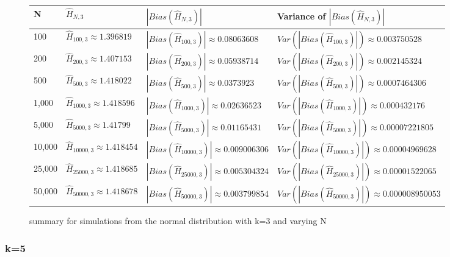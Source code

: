 \documentclass{article}
\begin{document}
\begin{figure} 
 \begin{adjustwidth}{-2cm}{}
\begin{tabular}{|l|l|l|l|}
\hline
N & $\hat{H}_{N, 3}$ & $|Bias(\hat{H}_{N, 3})|$ & Variance of $|Bias(\hat{H}_{N, 3})|$ \\
\hline
100 & $\hat{H}_{100, 3} \approx 1.396819$ & $|Bias(\hat{H}_{100, 3})| \approx 0.08063608$ & $Var(|Bias(\hat{H}_{100, 3})|) \approx 0.003750528$\\
200 & $\hat{H}_{200, 3} \approx 1.407153$ & $|Bias(\hat{H}_{200, 3})| \approx 0.05938714$ & $Var(|Bias(\hat{H}_{200, 3})|) \approx 0.002145324$\\
500 & $\hat{H}_{500, 3} \approx 1.418022$ & $|Bias(\hat{H}_{500, 3})| \approx 0.0373923$ & $Var(|Bias(\hat{H}_{500, 3})|) \approx 0.0007464306$\\
1,000 & $\hat{H}_{1000, 3} \approx 1.418596$ & $|Bias(\hat{H}_{1000, 3})| \approx 0.02636523$ & $Var(|Bias(\hat{H}_{1000, 3})|) \approx 0.000432176$\\
5,000 & $\hat{H}_{5000, 3} \approx 1.41799$ & $|Bias(\hat{H}_{5000, 3})| \approx 0.01165431$ & $Var(|Bias(\hat{H}_{5000, 3})|) \approx 0.00007221805$\\
10,000 & $\hat{H}_{10000, 3} \approx 1.418454$ & $|Bias(\hat{H}_{10000, 3})| \approx 0.009006306$ & $Var(|Bias(\hat{H}_{10000, 3})|) \approx 0.00004969628$\\
25,000 & $\hat{H}_{25000, 3} \approx 1.418685$ & $|Bias(\hat{H}_{25000, 3})| \approx 0.005304324$ & $Var(|Bias(\hat{H}_{25000, 3})|) \approx 0.00001522065$\\
50,000 & $\hat{H}_{50000, 3} \approx 1.418678$ & $|Bias(\hat{H}_{50000, 3})| \approx 0.003799854$ & $Var(|Bias(\hat{H}_{50000, 3})|) \approx 0.000008950053$\\
\hline
\end{tabular}
\caption{\label{fig:normal_k=3} summary for simulations from the normal distribution with k=3 and varying N}
 \end{adjustwidth}
\end{figure}


\subsubsection{k=5}
\end{document}
